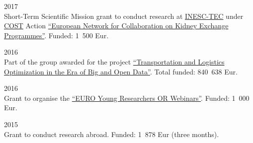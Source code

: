 \begin{paracol}{2}
  \textsc{2017}
\switchcolumn
  \\
  Short-Term Scientific Mission grant to conduct research at \href{https://www.inesctec.pt/}{INESC-TEC} under \href{http://www.cost.eu/}{COST} Action \href{http://www.enckep-cost.eu/}{``European Network for Collaboration on Kidney Exchange Programmes''}.
  Funded: 1~500 Eur.
\end{paracol}

\begin{paracol}{2}
  \textsc{2016}
\switchcolumn
  \\
  Part of the group awarded for the project \href{https://santini.in/files/cv/prin16.pdf}{``Transportation and Logistics Optimization in the Era of Big and Open Data''}.
  Total funded: 840~638 Eur.
\end{paracol}

\begin{paracol}{2}
  \textsc{2016}
\switchcolumn
  \\
  Grant to organise the \href{https://www.airoyoung.org/resources/euro-seminars}{``EURO Young Researchers OR Webinars''}.
  Funded: 1~000 Eur.
\end{paracol}

\begin{paracol}{2}
  \textsc{2015}
\switchcolumn
  \\
  Grant to conduct research abroad.
  Funded: 1~878 Eur (three months).
\end{paracol}